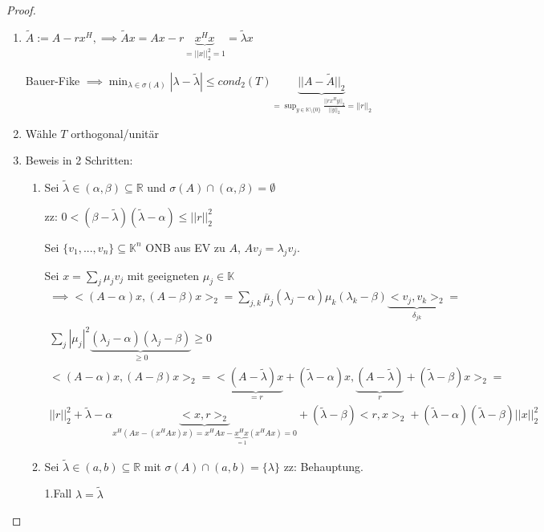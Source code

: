 \begin{proof}
	\begin{enumerate}
		\item $\tilde{A} := A - rx^H, \implies \tilde{A}x = Ax - r\underbrace{x^Hx}_{=||x||_2^2 = 1} = \tilde{\lambda}x$
		
		Bauer-Fike $\implies \min_{\lambda \in \sigma(A)} |\lambda - \tilde{\lambda}| \leq cond_2(T) \underbrace{||A - \tilde{A}||_2}_{= \sup_{y \in \mathbb{K}\setminus\{0\}} \frac{||rx^Hy||_2}{||y||_2} = ||r||_2 }$
		
		\item Wähle $T$ orthogonal/unitär \checkmark
		
		\item Beweis in 2 Schritten:
		\begin{enumerate}
			\item Sei $\tilde{\lambda} \in (\alpha, \beta) \subseteq \mathbb{R}$ und $\sigma(A) \cap (\alpha, \beta) = \emptyset$
			
			zz: $0 < (\beta - \tilde{\lambda})(\tilde{\lambda} - \alpha) \leq ||r||_2^2$
			
			Sei $\{v_1, ..., v_n\} \subseteq \mathbb{K}^n$ ONB aus EV zu $A$, $Av_j = \lambda_j v_j$.
			
			Sei $x = \sum_j \mu_j v_j$ mit geeigneten $\mu_j \in \mathbb{K}$
			\begin{align*}
				\implies <(A - \alpha)x, (A - \beta)x>_2 =
				\sum_{j,k} \bar{\mu}_j (\lambda_j - \alpha) \mu_k (\lambda_k - \beta) \underbrace{<v_j, v_k>_2}_{\delta_{jk}} =\\
				\sum_j |\mu_j|^2 \underbrace{(\lambda_j - \alpha)(\lambda_j - \beta)}_{\geq 0} \geq 0\\
				<(A - \alpha)x, (A - \beta)x>_2 = <\underbrace{(A - \tilde{\lambda})x}_{=r} + (\tilde{\lambda} - \alpha)x, \underbrace{(A-\tilde{\lambda})}_{r} + (\tilde{\lambda} - \beta)x>_2 =\\
				||r||_2^2 + \tilde{\lambda} - \alpha \underbrace{<x, r>_2}_{x^H(Ax - (x^HAx)x) = x^HAx - \underbrace{x^Hx}_{=1}(x^HAx) = 0} + (\tilde{\lambda} - \beta)<r, x>_2 + (\tilde{\lambda} - \alpha)(\tilde{\lambda} - \beta)||x||_2^2
			\end{align*}
			
			\item Sei $\tilde{\lambda} \in (a,b) \subseteq \mathbb{R}$ mit $\sigma(A) \cap (a,b) = \{\lambda\}$ zz: Behauptung.
			
			1.Fall $\lambda = \tilde{\lambda}$ \checkmark
			

\end{enumerate}
\end{enumerate}
\end{proof}

